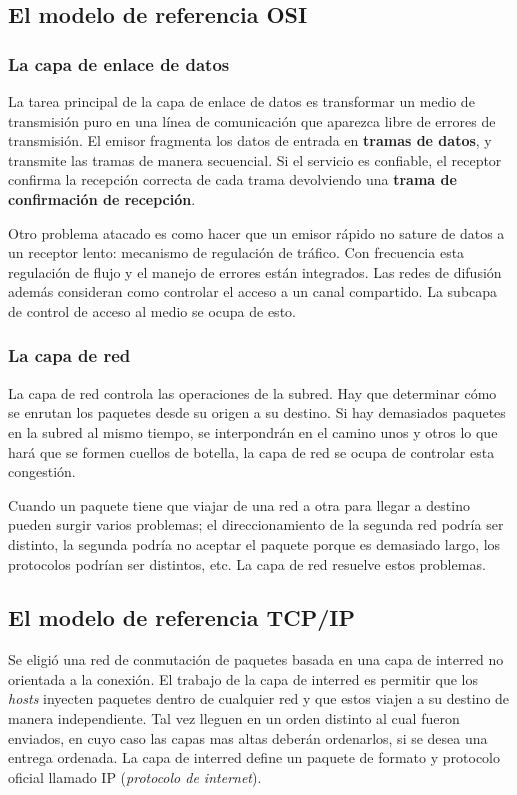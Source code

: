 \documentclass[10pt,a4paper]{report}
\begin{document}
\subsection{El modelo de referencia OSI}

\subsubsection{La capa de enlace de datos}
\par La tarea principal de la capa de enlace de datos es transformar un medio de 
transmisión puro en una línea de comunicación que aparezca libre de errores de 
transmisión. El emisor fragmenta los datos de entrada en \textbf{tramas de datos}, y 
transmite las tramas de manera secuencial. Si el servicio es confiable, el receptor 
confirma la recepción correcta de cada trama devolviendo una \textbf{trama de 
confirmación de recepción}.
\par Otro problema atacado es como hacer que un emisor rápido no sature de datos a 
un receptor lento: mecanismo de regulación de tráfico. Con frecuencia esta regulación 
de flujo y el manejo de errores están integrados. Las redes de difusión además 
consideran como controlar el acceso a un canal compartido. La subcapa de control de 
acceso al medio se ocupa de esto.

\subsubsection{La capa de red}
\par La capa de red controla las operaciones de la subred. Hay que determinar cómo se enrutan los paquetes desde su origen a su destino. Si hay demasiados paquetes en la subred al mismo tiempo, se interpondrán en el camino unos y otros lo que hará que se formen cuellos de botella, la capa de red se ocupa de controlar esta congestión.
\par Cuando un paquete tiene que viajar de una red a otra para llegar a destino pueden surgir varios problemas; el direccionamiento de la segunda red podría ser distinto, la segunda podría no aceptar el paquete porque es demasiado largo, los protocolos podrían ser distintos, etc. La capa de red resuelve estos problemas.

\subsection{El modelo de referencia TCP/IP}

	\par Se eligió una red de conmutación de paquetes basada en una capa de interred no 
orientada a la conexión. El trabajo de la capa de interred es permitir que los \textit{hosts} inyecten paquetes dentro de cualquier red y que estos viajen a su destino de manera independiente. Tal vez lleguen en un orden distinto al cual fueron enviados, en cuyo caso las capas mas altas deberán ordenarlos, si se desea una entrega ordenada. La capa de interred define un paquete de formato y protocolo oficial llamado IP (\textit{protocolo de internet}).
\end{document}
